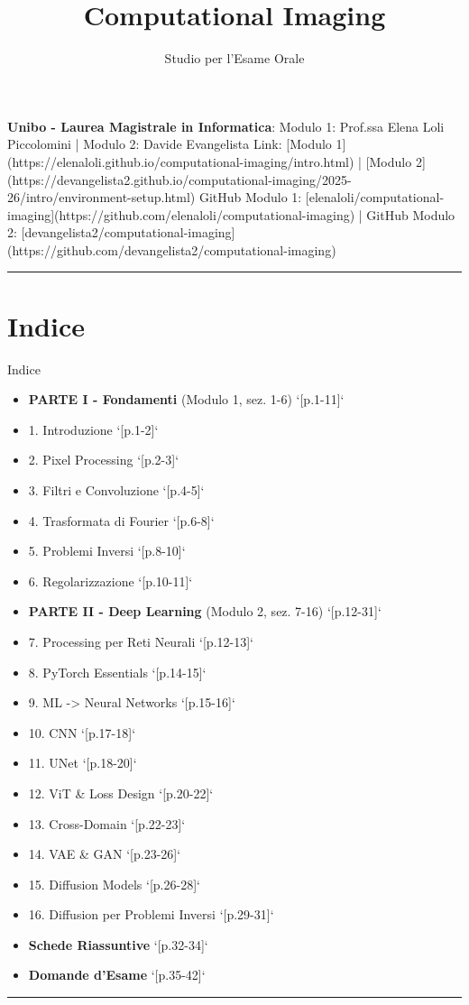 \documentclass[italian,10pt]{beamer}
\title{Computational Imaging}
\subtitle{Studio per l'Esame Orale}
\date{}
\begin{document}
\frame{\titlepage}

\begin{frame}{}
\textbf{Unibo - Laurea Magistrale in Informatica}: 
Modulo 1: Prof.ssa Elena Loli Piccolomini | Modulo 2: Davide Evangelista
Link: [Modulo 1](https://elenaloli.github.io/computational-imaging/intro.html) | [Modulo 2](https://devangelista2.github.io/computational-imaging/2025-26/intro/environment-setup.html)
GitHub Modulo 1: [elenaloli/computational-imaging](https://github.com/elenaloli/computational-imaging) | GitHub Modulo 2: [devangelista2/computational-imaging](https://github.com/devangelista2/computational-imaging)
\medskip\noindent\rule{\textwidth}{0.4pt}\medskip
\end{frame}

\section{Indice}
\begin{frame}{Indice}
\tableofcontents[currentsection]
\end{frame}

\begin{frame}[allowframebreaks]{}
\begin{itemize}
\item \textbf{PARTE I - Fondamenti} (Modulo 1, sez. 1-6) `[p.1-11]`
\item 1. Introduzione `[p.1-2]`
\item 2. Pixel Processing `[p.2-3]`
\item 3. Filtri e Convoluzione `[p.4-5]`
\item 4. Trasformata di Fourier `[p.6-8]`
\item 5. Problemi Inversi `[p.8-10]`
\item 6. Regolarizzazione `[p.10-11]`
\item \textbf{PARTE II - Deep Learning} (Modulo 2, sez. 7-16) `[p.12-31]`
\item 7. Processing per Reti Neurali `[p.12-13]`
\item 8. PyTorch Essentials `[p.14-15]`
\item 9. ML -> Neural Networks `[p.15-16]`
\item 10. CNN `[p.17-18]`
\item 11. UNet `[p.18-20]`
\item 12. ViT \& Loss Design `[p.20-22]`
\item 13. Cross-Domain `[p.22-23]`
\item 14. VAE \& GAN `[p.23-26]`
\item 15. Diffusion Models `[p.26-28]`
\item 16. Diffusion per Problemi Inversi `[p.29-31]`
\item \textbf{Schede Riassuntive} `[p.32-34]`
\item \textbf{Domande d'Esame} `[p.35-42]`
\end{itemize}
\medskip\noindent\rule{\textwidth}{0.4pt}\medskip
\end{frame}
\end{document}

